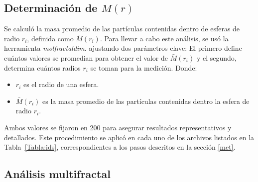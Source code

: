 	
	
	
	\subsection{Determinaci\'{o}n de $M(r)$}
	
	Se calcul\'{o} la masa promedio de las part\'{i}culas contenidas dentro de esferas de radio $r_i$, definida como $\bar{M}(r_i)$. 
	Para llevar a cabo este an\'{a}lisis, se us\'{o} la herramienta \textit{molfractaldim}. ajustando dos par\'{a}metros clave: El primero define cu\'{a}ntos valores se promedian para obtener el valor de $\bar{M}(r_i)$ y el segundo, determina cu\'{a}ntos radios $r_{i}$ se toman para la medici\'{o}n. Donde: 
	
	\begin{itemize}
		\item $r_{i}$ es el radio de una esfera.
		\item $\bar M(r_{i})$ es la masa promedio de las part\'{i}culas contenidas dentro la esfera de radio $r_{i}$.
	\end{itemize}
	
	
	
	Ambos valores se fijaron en 200 para asegurar resultados representativos y detallados. Este procedimiento se aplic\'{o} en cada uno de los archivos listados en la Tabla~\ref{Tabla:ids}, correspondientes a los pasos descritos en la secci\'{o}n \ref{met}.
	
	

	
	
	\subsection{An\'{a}lisis multifractal}
	
